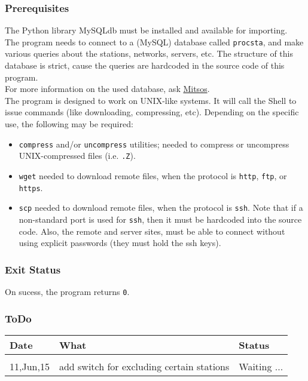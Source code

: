 \subsubsection{Prerequisites}
The Python library MySQLdb must be installed and available for importing.\\

The program needs to connect to a (MySQL) database called \texttt{procsta}, 
and make various queries
about the stations, networks, servers, etc. The structure of this database
is strict, cause the queries are hardcoded in the source code of this program.\\

For more information on the used database, ask \href{mailto:danast@mail.ntua.gr}{Mitsos}.\\

The program is designed to work on UNIX-like systems. It will call the Shell to issue commands (like
downloading, compressing, etc). Depending on the specific use, the following may be required:
\begin{itemize}
\item \texttt{compress} and/or \texttt{uncompress} utilities; needed to compress or uncompress
UNIX-compressed files (i.e. \texttt{.Z}).
\item \texttt{wget} needed to download remote files, when the protocol is \texttt{http}, \texttt{ftp}, or \texttt{https}.
\item \texttt{scp} needed to download remote files, when the protocol is \texttt{ssh}. Note that if a non-standard port
is used for \texttt{ssh}, then it must be hardcoded into the source code. Also, the remote and server sites, must be able to
connect without using explicit passwords (they must hold the ssh keys).
\end{itemize}

\subsubsection{Exit Status}
On sucess, the program returns \texttt{0}.

\subsubsection{ToDo}
\begin{tabular}{l l l}
Date & What & Status\\
\hline \\
11,Jun,15  & add switch for excluding certain stations & Waiting ...\\
\end{tabular}

